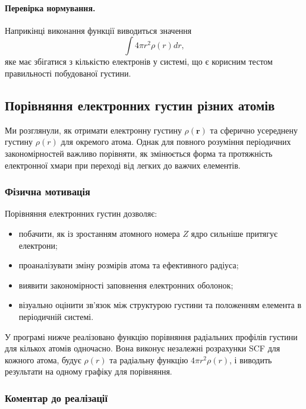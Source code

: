 \paragraph{Перевірка нормування.}
Наприкінці виконання функції виводиться значення
\[
    \int 4\pi r^2 \rho(r) dr,
\]
яке має збігатися з кількістю електронів у системі, що є корисним тестом правильності побудованої густини.


\subsection{Порівняння електронних густин різних атомів}

Ми розглянули, як отримати електронну густину $\rho(\mathbf{r})$ та сферично усереднену густину $\rho(r)$ для окремого атома.  Однак для повного розуміння періодичних закономірностей важливо порівняти, як змінюється форма та протяжність електронної хмари при переході від легких до важчих елементів.

\subsubsection{Фізична мотивація}

Порівняння електронних густин дозволяє:
\begin{itemize}
    \item побачити, як із зростанням атомного номера $Z$ ядро сильніше притягує електрони;
    \item проаналізувати зміну розмірів атома та ефективного радіуса;
    \item виявити закономірності заповнення електронних оболонок;
    \item візуально оцінити зв’язок між структурою густини та положенням елемента в періодичній системі.
\end{itemize}

У програмі нижче реалізовано функцію порівняння радіальних профілів густини для кількох атомів одночасно.
Вона виконує незалежні розрахунки SCF для кожного атома, будує $\rho(r)$ та радіальну функцію $4\pi r^2 \rho(r)$, і виводить результати на одному графіку для порівняння.

\subsubsection{Коментар до реалізації}

